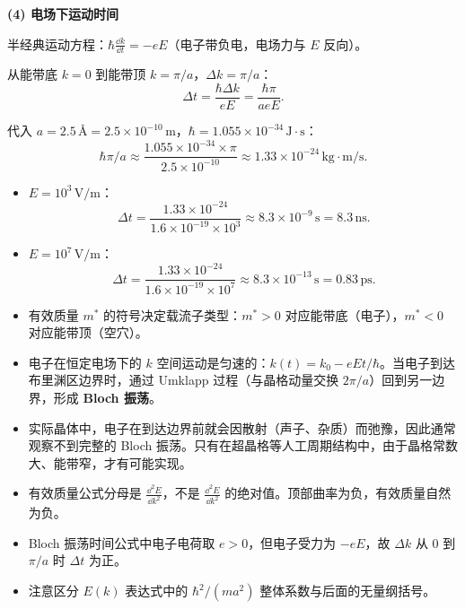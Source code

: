 \begin{derivationbox}[标准解题过程]
\textbf{(4) 电场下运动时间}

半经典运动方程：$\hbar\frac{\dd k}{\dd t}=-eE$（电子带负电，电场力与 $E$ 反向）。

从能带底 $k=0$ 到能带顶 $k=\pi/a$，$\Delta k=\pi/a$：
\begin{equation}
\Delta t=\frac{\hbar\Delta k}{eE}=\frac{\hbar\pi}{aeE}.
\end{equation}

代入 $a=2.5\,\text{\AA}=2.5\times10^{-10}\,\text{m}$，$\hbar=1.055\times10^{-34}\,\text{J}\cdot\text{s}$：
\begin{equation}
\hbar\pi/a\approx\frac{1.055\times10^{-34}\times\pi}{2.5\times10^{-10}}
\approx1.33\times10^{-24}\,\text{kg}\cdot\text{m/s}.
\end{equation}

\begin{itemize}
    \item $E=10^3\,\text{V/m}$：
    \begin{equation}
    \Delta t=\frac{1.33\times10^{-24}}{1.6\times10^{-19}\times10^3}
    \approx\boxed{8.3\times10^{-9}\,\text{s}=8.3\,\text{ns}.}
    \end{equation}
    \item $E=10^7\,\text{V/m}$：
    \begin{equation}
    \Delta t=\frac{1.33\times10^{-24}}{1.6\times10^{-19}\times10^7}
    \approx\boxed{8.3\times10^{-13}\,\text{s}=0.83\,\text{ps}.}
    \end{equation}
\end{itemize}
\end{derivationbox}

\begin{insightbox}[物理图像]
\begin{itemize}
    \item 有效质量 $m^*$ 的符号决定载流子类型：$m^*>0$ 对应能带底（电子），$m^*<0$ 对应能带顶（空穴）。
    \item 电子在恒定电场下的 $k$ 空间运动是匀速的：$k(t)=k_0-eEt/\hbar$。当电子到达布里渊区边界时，通过 Umklapp 过程（与晶格动量交换 $2\pi/a$）回到另一边界，形成 \textbf{Bloch 振荡}。
    \item 实际晶体中，电子在到达边界前就会因散射（声子、杂质）而弛豫，因此通常观察不到完整的 Bloch 振荡。只有在超晶格等人工周期结构中，由于晶格常数大、能带窄，才有可能实现。
\end{itemize}
\end{insightbox}

\begin{warnbox}[常见失误]
\begin{itemize}
    \item 有效质量公式分母是 $\frac{\dd^2E}{\dd k^2}$，不是 $\frac{\dd^2E}{\dd k^2}$ 的绝对值。顶部曲率为负，有效质量自然为负。
    \item Bloch 振荡时间公式中电子电荷取 $e>0$，但电子受力为 $-eE$，故 $\Delta k$ 从 $0$ 到 $\pi/a$ 时 $\Delta t$ 为正。
    \item 注意区分 $E(k)$ 表达式中的 $\hbar^2/(ma^2)$ 整体系数与后面的无量纲括号。
\end{itemize}
\end{warnbox}
